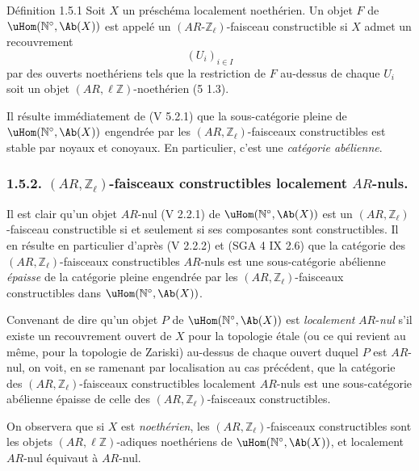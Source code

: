 \begin{statement}{Définition 1.5.1}
Soit \(X\) un préschéma localement noethérien. Un objet \(F\) de \(\uHom(\mathbb{N}^\circ,\Ab(X))\) est appelé un \((AR\text{-}\mathbb{Z}_\ell)\)-faisceau constructible si \(X\) admet un recouvrement
\[
(U_i)_{i\in I}
\]
par des
ouverts noethériens tels que la restriction de \(F\) au-dessus de chaque \(U_i\) soit un objet \((AR,\ell\mathbb{Z})\)-noethérien (5 1.3).
\end{statement}

Il résulte immédiatement de (V 5.2.1) que la sous-catégorie pleine de \(\uHom(\mathbb{N}^\circ,\Ab(X))\) engendrée par les \((AR,\mathbb{Z}_\ell)\)-faisceaux constructibles est stable par noyaux et conoyaux. En particulier, c'est une \emph{catégorie abélienne}.

\subsubsection*{1.5.2. \((AR,\mathbb{Z}_\ell)\)-faisceaux constructibles localement \(AR\)-nuls.}

Il est clair qu'un objet \(AR\)-nul (V 2.2.1) de \(\uHom(\mathbb{N}^\circ,\Ab(X))\) est un \((AR,\mathbb{Z}_\ell)\)-faisceau constructible si et seulement si ses composantes sont constructibles. Il en résulte en particulier d'après (V 2.2.2) et (SGA 4 IX 2.6) que la catégorie des \((AR,\mathbb{Z}_\ell)\)-faisceaux constructibles \(AR\)-nuls est une sous-catégorie abélienne \emph{épaisse} de la catégorie pleine engendrée par les \((AR,\mathbb{Z}_\ell)\)-faisceaux constructibles dans \(\uHom(\mathbb{N}^\circ,\Ab(X))\).

Convenant de dire qu'un objet \(P\) de \(\uHom(\mathbb{N}^\circ,\Ab(X))\) est \emph{localement} \(AR\)-\emph{nul} s'il existe un recouvrement ouvert de \(X\) pour la topologie étale (ou ce qui revient au même, pour la topologie de Zariski) au-dessus de chaque ouvert duquel \(P\) est \(AR\)-nul, on voit, en se ramenant par localisation au cas précédent, que la catégorie des \((AR,\mathbb{Z}_\ell)\)-faisceaux constructibles localement \(AR\)-nuls est une sous-catégorie abélienne épaisse de celle des \((AR,\mathbb{Z}_\ell)\)-faisceaux constructibles.

On observera que si \(X\) est \emph{noethérien}, les \((AR,\mathbb{Z}_\ell)\)-faisceaux constructibles sont les objets \((AR,\ell\mathbb{Z})\)-adiques noethériens de \(\uHom(\mathbb{N}^\circ,\Ab(X))\), et localement \(AR\)-nul équivaut à \(AR\)-nul.


